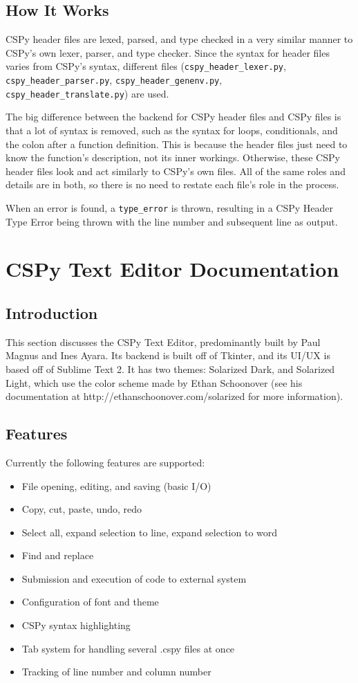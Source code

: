 \documentclass{article}
\begin{document}
\subsection{How It Works}
CSPy header files are lexed, parsed, and type checked in a very similar manner to CSPy's own lexer, parser, and type checker. Since the syntax for header files varies from CSPy's syntax, different files (\verb|cspy_header_lexer.py|, \verb|cspy_header_parser.py|, \verb|cspy_header_genenv.py|,\\ %
\verb|cspy_header_translate.py|) are used.

The big difference between the backend for CSPy header files and CSPy files is that a lot of syntax is removed, such as the syntax for loops, conditionals, and the colon after a function definition. This is because the header files just need to know the function's description, not its inner workings. Otherwise, these CSPy header files look and act similarly to CSPy's own files. All of the same roles and details are in both, so there is no need to restate each file's role in the process.

When an error is found, a \verb|type_error| is thrown, resulting in a CSPy Header Type Error being thrown with the line number and subsequent line as output.
\pagebreak
\section{CSPy Text Editor Documentation}
\subsection{Introduction}
This section discusses the CSPy Text Editor, predominantly built by Paul Magnus and Ines Ayara. Its backend is built off of Tkinter, and its UI/UX is based off of Sublime Text 2. It has two themes: Solarized Dark, and Solarized Light, which use the color scheme made by Ethan Schoonover (see his documentation at http://ethanschoonover.com/solarized for more information).
\subsection{Features}
Currently the following features are supported:
\begin{itemize}
\item File opening, editing, and saving (basic I/O)
\item Copy, cut, paste, undo, redo
\item Select all, expand selection to line, expand selection to word
\item Find and replace
\item Submission and execution of code to external system
\item Configuration of font and theme
\item CSPy syntax highlighting
\item Tab system for handling several .cspy files at once
\item Tracking of line number and column number
\end{itemize}
\end{document}
